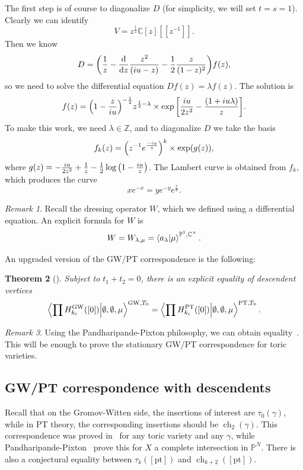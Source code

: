 \documentclass[leqno, openany]{memoir}
\newtheorem{thm}{Theorem}[section]
\theoremstyle{definition}
\theoremstyle{remark}
\newtheorem{rmk}[thm]{Remark}
\theoremstyle{plain}
\theoremstyle{definition}
\theoremstyle{remark}
\newcommand{\C}{\mathbb{C}}
\newcommand{\Z}{\mathbb{Z}}
\renewcommand{\P}{\mathbb{P}}
\newcommand{\mr}[1]{\mathrm{#1}}
\DeclareMathOperator{\ch}{ch}
\begin{document}
The first step is of course to diagonalize $D$ (for simplicity, we will set $t=s=1$). Clearly we can identify
\[ V = z^{\frac{1}{2}} \C[z][[z^{-1}]]. \]
Then we know
\[ D = \qty(\frac{1}{z} - \dv{z} \frac{z^2}{(iu-z)} - \frac{1}{2} \frac{z}{(1-z)^2}) f(z), \]
so we need to solve the differential equation $Df(z) = \lambda f(z)$. The solution is
\[ f(z) = \qty(1-\frac{z}{iu})^{-\frac{1}{2}} z^{\frac{1}{2}-\lambda} \times \exp \qty[\frac{iu}{2z^2} - \frac{(1+iu\lambda)}{z}]. \]
To make this work, we need $\lambda \in \Z$, and to diagonalize $D$ we take the basis
\[ f_k(z) = \qty(z^{-1} e^{\frac{-iu}{z}})^k \times \exp(g(z)), \]
where $g(z) = -\frac{iu}{2z^2} + \frac{1}{z} - \frac{1}{2} \log\qty(1-\frac{iu}{z})$. The Lambert curve is obtained from $f_k$, which produces the curve 
\[ xe^{-x} = ye^{-y} e^{\frac{x}{\theta}}. \]

\begin{rmk}
    Recall the dressing operator $W$, which we defined using a differential equation. An explicit formula for $W$ is
    \[ W = W_{\lambda,\mu} = \braket{a_{\lambda}}{\mu}^{\P^1, \C^{\times}}. \]
\end{rmk}

An upgraded version of the GW/PT correspondence is the following:
\begin{thm}[\cite{gwptdescendent}]
    Subject to $t_1 + t_2 = 0$, there is an explicit equality of descendent vertices
    \[ \braket{\prod H_{k_i}^{\mr{GW}}([0])}{\emptyset, \emptyset, \mu}^{\mr{GW}, T_0} =\braket{\prod H_{k_i}^{\mr{PT}}([0])}{\emptyset, \emptyset, \mu}^{\mr{PT}, T_0}. \]
\end{thm}

\begin{rmk}
    Using the Pandharipande-Pixton philosophy, we can obtain equality~. This will be enough to prove the stationary GW/PT correspondence for toric varieties.
\end{rmk}

\subsection{GW/PT correspondence with descendents}

Recall that on the Gromov-Witten side, the insertions of interest are $\tau_0(\gamma)$, while in PT theory, the corresponding insertions should be $\ch_2(\gamma)$. This correspondence was proved in~\cite{moop} for any toric variety and any $\gamma$, while Pandharipande-Pixton~\cite{ppquintic} prove this for $X$ a complete intersection in $\P^N$. There is also a conjectural equality between $\tau_k([\mr{pt}])$ and $\ch_{k+2}([\mr{pt}])$.
\end{document}
